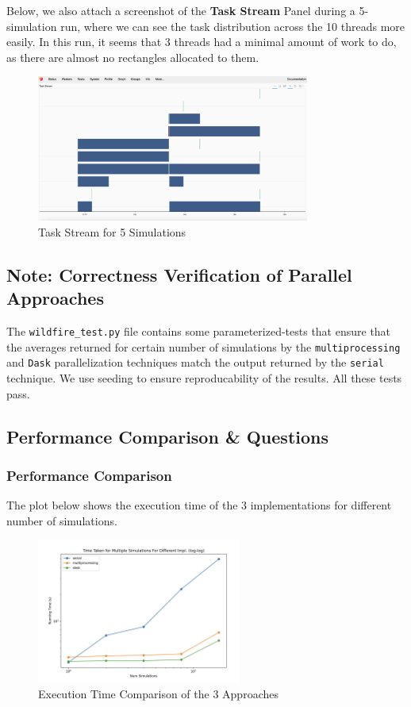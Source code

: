\documentclass[a4paper,12pt]{article}
\begin{document}
Below, we also attach a screenshot of the \textbf{Task Stream} Panel during a 5-simulation run, where we can see the task distribution across the 10 threads more easily. In this run, it seems that 3 threads had a minimal amount of work to do, as there are almost no rectangles allocated to them. 

\begin{figure}[H]
  \centering
  \includegraphics[width=0.8\textwidth]{../images/a4_ex1_dask_task_stream.png}
  \caption{Task Stream for 5 Simulations}
\end{figure}

\subsection*{Note: Correctness Verification of Parallel Approaches}
The \verb|wildfire_test.py| file contains some parameterized-tests that ensure that the averages returned for certain number of simulations by the \verb|multiprocessing| and \verb|Dask| parallelization techniques match the output returned by the \verb|serial| technique. We use seeding to ensure reproducability of the results. All these tests pass.

\subsection{Performance Comparison \& Questions}

\subsubsection{Performance Comparison}
The plot below shows the execution time of the 3 implementations for different number of simulations. 
\begin{figure}[H]
  \centering
  \includegraphics[width=0.6\textwidth]{../images/a4_ex1_runtime_comparison.png}
  \caption{Execution Time Comparison of the 3 Approaches}
\end{figure}
\end{document}
